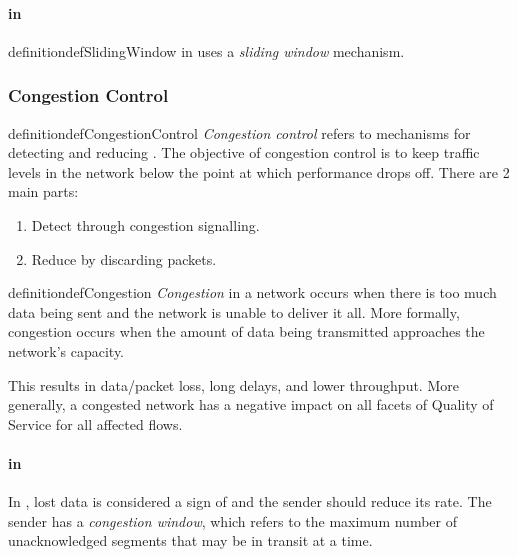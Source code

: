\paragraph{ in }\label{par:TCP_Flow_Control}
\begin{restatable}{definition}{defSlidingWindow}\label{def:Sliding_Window}
   in  uses a \emph{sliding window} mechanism.
\end{restatable}

\subsubsection{Congestion Control}\label{subsubsec:Review_Congestion_Control}
\begin{restatable}{definition}{defCongestionControl}\label{def:Congestion_Control}
  \emph{Congestion control} refers to mechanisms for detecting and reducing .
  The objective of congestion control is to keep traffic levels in the network below the point at which performance drops off.
  There are 2 main parts:
  \begin{enumerate}[noitemsep]
  \item Detect  through congestion signalling.
  \item Reduce  by discarding packets.
  \end{enumerate}
\end{restatable}

\begin{restatable}[Congestion]{definition}{defCongestion}\label{def:Congestion}
  \emph{Congestion} in a network occurs when there is too much data being sent and the network is unable to deliver it all.
  More formally, congestion occurs when the amount of data being transmitted approaches the network's capacity.

  This results in data/packet loss, long delays, and lower throughput.
  More generally, a congested network has a negative impact on all facets of Quality of Service for all affected flows.
\end{restatable}

\paragraph{ in }\label{par:Review_Congestion_Control}
\begin{definition}\label{def:Congestion_Window}
  In , lost data is considered a sign of  and the sender should reduce its rate.
  The sender has a \emph{congestion window}, which refers to the maximum number of unacknowledged segments that may be in transit at a time.
\end{definition}

